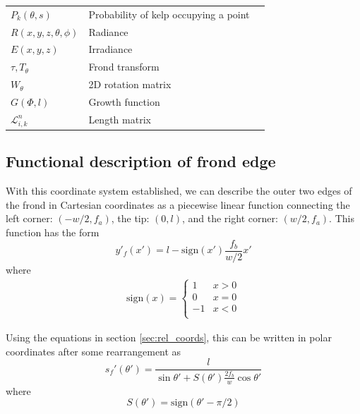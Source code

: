 \documentclass[10pt]{article}
\newenvironment{mcfig}
	{\par\medskip\noindent\minipage{\linewidth}}
	{\endminipage\par\medskip}
\newcommand{\sign}{\mbox{sign}}
\newcommand\LL{\mathcal{L}}
\begin{document}
\begin{multicols}{2}
\begin{mcfig}
\begin{tabular}{@{}llc@{}}
		$P_k(\theta,s)$           & Probability of kelp occupying a point & \\ 
		$R(x,y,z,\theta,\phi)$    & Radiance                              & \\
		$E(x,y,z)$                & Irradiance                            & \\
		$\tau,T_\theta$           & Frond transform                       & \\
		$W_\theta$                & 2D rotation matrix                    & \\
		$G(\Phi,l)$               & Growth function                       & \\
		$\LL_{i,k}^n$             & Length matrix                         & \\
		\bottomrule
	\end{tabular}
	\label{fig:variables}
\end{mcfig}

\subsection{Functional description of frond edge}
With this coordinate system established, we can describe the outer two edges of the frond in Cartesian coordinates as a piecewise linear function connecting the left corner: $(-w/2,f_a)$, the tip: $(0,l)$, and the right corner: $(w/2,f_a)$.
This function has the form
\begin{equation}
	y'_f(x') = l-\sign(x')\frac{f_b}{w/2}x'
\end{equation}
where
\begin{align}
	\sign(x) = 
	\begin{cases}
		1 & x > 0 \\
		0 & x = 0 \\
		-1 & x < 0 \\
	\end{cases}
\end{align}

Using the equations in section \ref{sec:rel_coords}, this can be written in polar coordinates after some rearrangement as
\begin{equation}
	s_f'(\theta') = \frac{l}{\sin\theta' + S(\theta')\frac{2f_b}{w}\cos\theta'}
\end{equation}
where
\begin{equation}
	S(\theta') = \sign(\theta'-\pi/2)
\end{equation}


\end{multicols}
\end{document}

